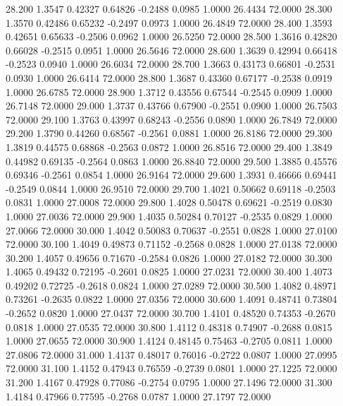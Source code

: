   28.200   1.3547   0.42327   0.64826  -0.2488   0.0985   1.0000  26.4434  72.0000
  28.300   1.3570   0.42486   0.65232  -0.2497   0.0973   1.0000  26.4849  72.0000
  28.400   1.3593   0.42651   0.65633  -0.2506   0.0962   1.0000  26.5250  72.0000
  28.500   1.3616   0.42820   0.66028  -0.2515   0.0951   1.0000  26.5646  72.0000
  28.600   1.3639   0.42994   0.66418  -0.2523   0.0940   1.0000  26.6034  72.0000
  28.700   1.3663   0.43173   0.66801  -0.2531   0.0930   1.0000  26.6414  72.0000
  28.800   1.3687   0.43360   0.67177  -0.2538   0.0919   1.0000  26.6785  72.0000
  28.900   1.3712   0.43556   0.67544  -0.2545   0.0909   1.0000  26.7148  72.0000
  29.000   1.3737   0.43766   0.67900  -0.2551   0.0900   1.0000  26.7503  72.0000
  29.100   1.3763   0.43997   0.68243  -0.2556   0.0890   1.0000  26.7849  72.0000
  29.200   1.3790   0.44260   0.68567  -0.2561   0.0881   1.0000  26.8186  72.0000
  29.300   1.3819   0.44575   0.68868  -0.2563   0.0872   1.0000  26.8516  72.0000
  29.400   1.3849   0.44982   0.69135  -0.2564   0.0863   1.0000  26.8840  72.0000
  29.500   1.3885   0.45576   0.69346  -0.2561   0.0854   1.0000  26.9164  72.0000
  29.600   1.3931   0.46666   0.69441  -0.2549   0.0844   1.0000  26.9510  72.0000
  29.700   1.4021   0.50662   0.69118  -0.2503   0.0831   1.0000  27.0008  72.0000
  29.800   1.4028   0.50478   0.69621  -0.2519   0.0830   1.0000  27.0036  72.0000
  29.900   1.4035   0.50284   0.70127  -0.2535   0.0829   1.0000  27.0066  72.0000
  30.000   1.4042   0.50083   0.70637  -0.2551   0.0828   1.0000  27.0100  72.0000
  30.100   1.4049   0.49873   0.71152  -0.2568   0.0828   1.0000  27.0138  72.0000
  30.200   1.4057   0.49656   0.71670  -0.2584   0.0826   1.0000  27.0182  72.0000
  30.300   1.4065   0.49432   0.72195  -0.2601   0.0825   1.0000  27.0231  72.0000
  30.400   1.4073   0.49202   0.72725  -0.2618   0.0824   1.0000  27.0289  72.0000
  30.500   1.4082   0.48971   0.73261  -0.2635   0.0822   1.0000  27.0356  72.0000
  30.600   1.4091   0.48741   0.73804  -0.2652   0.0820   1.0000  27.0437  72.0000
  30.700   1.4101   0.48520   0.74353  -0.2670   0.0818   1.0000  27.0535  72.0000
  30.800   1.4112   0.48318   0.74907  -0.2688   0.0815   1.0000  27.0655  72.0000
  30.900   1.4124   0.48145   0.75463  -0.2705   0.0811   1.0000  27.0806  72.0000
  31.000   1.4137   0.48017   0.76016  -0.2722   0.0807   1.0000  27.0995  72.0000
  31.100   1.4152   0.47943   0.76559  -0.2739   0.0801   1.0000  27.1225  72.0000
  31.200   1.4167   0.47928   0.77086  -0.2754   0.0795   1.0000  27.1496  72.0000
  31.300   1.4184   0.47966   0.77595  -0.2768   0.0787   1.0000  27.1797  72.0000
